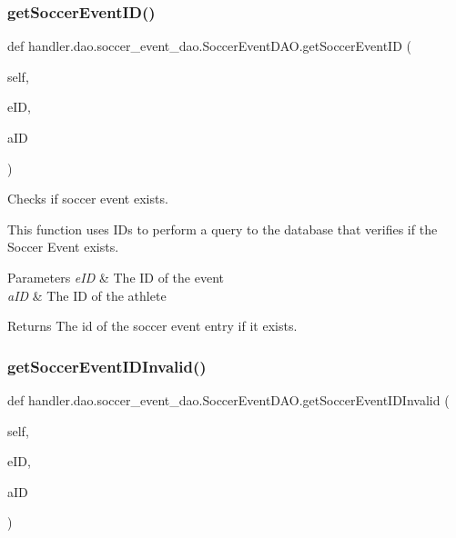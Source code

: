 \subsubsection{\texorpdfstring{get\+Soccer\+Event\+I\+D()}{getSoccerEventID()}}
{\footnotesize\ttfamily def handler.\+dao.\+soccer\+\_\+event\+\_\+dao.\+Soccer\+Event\+D\+A\+O.\+get\+Soccer\+Event\+ID (\begin{DoxyParamCaption}\item[{}]{self,  }\item[{}]{e\+ID,  }\item[{}]{a\+ID }\end{DoxyParamCaption})}



Checks if soccer event exists. 

This function uses I\+Ds to perform a query to the database that verifies if the Soccer Event exists.


\begin{DoxyParams}{Parameters}
{\em e\+ID} & The ID of the event \\
\hline
{\em a\+ID} & The ID of the athlete\\
\hline
\end{DoxyParams}
\begin{DoxyReturn}{Returns}
The id of the soccer event entry if it exists. 
\end{DoxyReturn}
\mbox{\label{classhandler_1_1dao_1_1soccer__event__dao_1_1_soccer_event_d_a_o_a73353319145f82f456e23a65574110ca}} 
\subsubsection{\texorpdfstring{get\+Soccer\+Event\+I\+D\+Invalid()}{getSoccerEventIDInvalid()}}
{\footnotesize\ttfamily def handler.\+dao.\+soccer\+\_\+event\+\_\+dao.\+Soccer\+Event\+D\+A\+O.\+get\+Soccer\+Event\+I\+D\+Invalid (\begin{DoxyParamCaption}\item[{}]{self,  }\item[{}]{e\+ID,  }\item[{}]{a\+ID }\end{DoxyParamCaption})}



